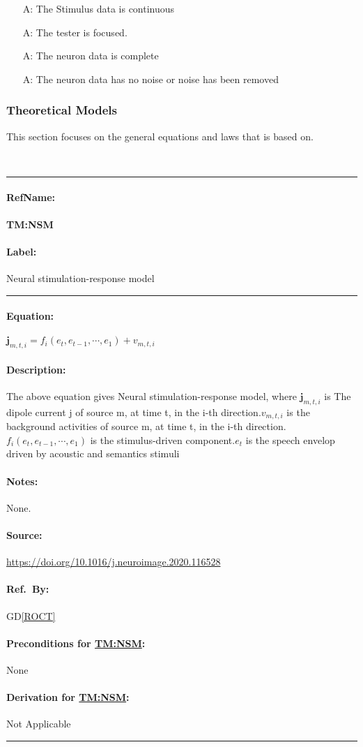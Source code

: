 \documentclass[12pt]{article}
\newcommand{\dref}[1]{GD\ref{#1}}
\newcounter{assumpnum} %
\newcommand{\deftheory}[9][Not Applicable]
{
\newpage
\noindent \rule{\textwidth}{0.5mm}

\paragraph{RefName: } \textbf{#2} \phantomsection 
\label{#2}

\paragraph{Label:} #3

\noindent \rule{\textwidth}{0.5mm}

\paragraph{Equation:}

#4

\paragraph{Description:}

#5

\paragraph{Notes:}

#6

\paragraph{Source:}

#7

\paragraph{Ref.\ By:}

#8

\paragraph{Preconditions for \hyperref[#2]{#2}:}
\label{#2_precond}

#9

\paragraph{Derivation for \hyperref[#2]{#2}:}
\label{#2_deriv}

#1

\noindent \rule{\textwidth}{0.5mm}

}
\begin{document}
\begin{itemize}

  \item[A\refstepcounter{assumpnum}\theassumpnum:] The Stimulus data is continuous
  \item[A\refstepcounter{assumpnum}\theassumpnum:] The tester is focused.
  \item[A\refstepcounter{assumpnum}\theassumpnum:] The neuron data is complete
  \item[A\refstepcounter{assumpnum}\theassumpnum:] The neuron data has no noise or noise has been removed

\end{itemize}

\subsubsection{Theoretical Models}\label{sec_theoretical}

%

This section focuses on the general equations and laws that \progname{} is based
on.

~\newline

\noindent
\deftheory
{TM:NSM}
{Neural stimulation-response model}
{

$\boldsymbol{j}_{m, t, i}=f_{i}\left(e_{t}, e_{t-1}, \cdots, e_{1}\right)+v_{m, t, i}$

}
{
  The above equation gives Neural stimulation-response model, where ${\boldsymbol{j}_{m, t, i}}$
is The dipole current j of source m, at time t, in the i-th direction.${v_{m, t, i}} $ is the background
activities of source m, at time t, in the i-th direction.${f_{i}\left(e_{t}, e_{t-1}, \cdots, e_{1}\right)}$
is the stimulus-driven component.$e_{t}$ is the speech envelop driven by acoustic and semantics stimuli

}
{
None.
}
{
  \url{https://doi.org/10.1016/j.neuroimage.2020.116528}
}
{
  \dref{ROCT}
}
{
None
}
{}
\end{document}
